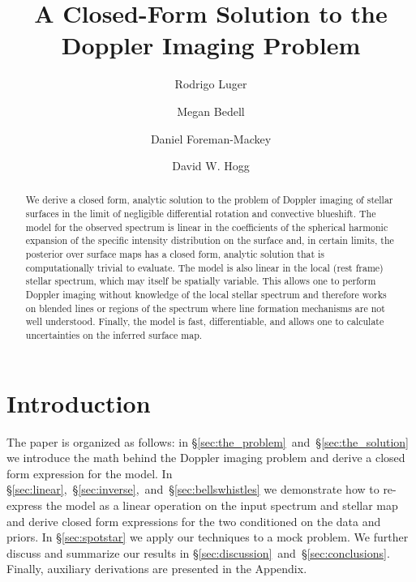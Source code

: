 \documentclass[modern]{aastex631}
\begin{document}
\title{A Closed-Form Solution to the Doppler Imaging Problem}

\author[0000-0002-0296-3826]{Rodrigo Luger}
%
\author{Megan Bedell}
%
\author{Daniel Foreman-Mackey}
%
\author{David W. Hogg}

\begin{abstract}
    We derive a closed form, analytic solution to the problem of Doppler imaging of stellar surfaces in the limit of negligible differential rotation and convective blueshift.
    The model for the observed spectrum is linear in the coefficients of the spherical harmonic expansion of the specific intensity distribution on the surface and, in certain limits, the posterior over surface maps has a closed form, analytic solution that is computationally trivial to evaluate.
    The model is also linear in the local (rest frame) stellar spectrum, which may itself be spatially variable.
    This allows one to perform Doppler imaging without knowledge of the local stellar spectrum and therefore works on blended lines or regions of the spectrum where line formation mechanisms are not well understood.
    Finally, the model is fast, differentiable, and allows one to calculate uncertainties on the inferred surface map.
\end{abstract}

\section{Introduction}
The paper is organized as follows: in \S\ref{sec:the_problem}~and~\S\ref{sec:the_solution} we introduce the math behind the Doppler imaging problem and derive a closed form expression for the model. 
In \S\ref{sec:linear},~\S\ref{sec:inverse},~and~\S\ref{sec:bellswhistles} we demonstrate how to re-express the model as a linear operation on the input spectrum and stellar map and derive closed form expressions for the two conditioned on the data and priors.
In \S\ref{sec:spotstar} we apply our techniques to a mock problem. 
We further discuss and summarize our results in \S\ref{sec:discussion}~and~\S\ref{sec:conclusions}. 
Finally, auxiliary derivations are presented in the Appendix.
\end{document}
